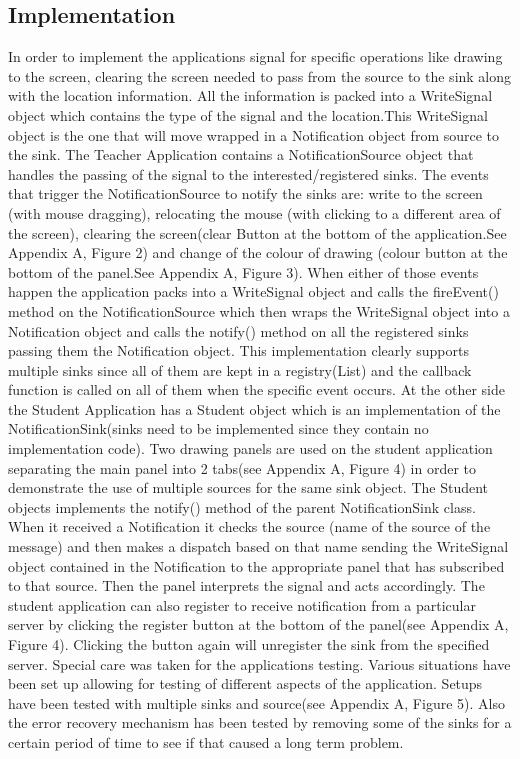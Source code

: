 \documentclass[a4paper,12pt,titlepage]{article}
\begin{document}
\subsection{Implementation}
In order to implement the applications signal for specific operations like drawing to the screen, clearing the screen needed to pass from the source to the sink along with the location information. All the information is packed into a WriteSignal object which contains the type of the signal and the location.This WriteSignal object is the one that will move wrapped in a Notification object from source to the sink. The Teacher Application contains a NotificationSource object that handles the passing of the signal to the interested/registered sinks. The events that trigger the NotificationSource to notify the sinks are: write to the screen (with mouse dragging), relocating the mouse (with clicking to a different area of the screen), clearing the screen(clear Button at the bottom of the application.See Appendix A, Figure 2) and change of the colour of drawing (colour button at the bottom of the panel.See Appendix A, Figure 3). When either of those events happen the application packs into a WriteSignal object and calls the fireEvent() method on the NotificationSource which then wraps the WriteSignal object into a Notification object and calls the notify() method on all the registered sinks passing them the Notification object. This implementation clearly supports multiple sinks since all of them are kept in a registry(List) and the callback function is called on all of them when the specific event occurs. At the other side the Student Application has a Student object which is an implementation of the NotificationSink(sinks need to be implemented since they contain no implementation code). Two drawing panels are used on the student application separating the main panel into 2 tabs(see Appendix A, Figure 4) in order to demonstrate the use of multiple sources for the same sink object. The Student objects implements the notify() method of the parent NotificationSink class. When it received a Notification it checks the source (name of the source of the message) and then makes a dispatch based on that name sending the WriteSignal object contained in the Notification to the appropriate panel that has subscribed to that source. Then the panel interprets the signal and acts accordingly. The student application can also register to receive notification from a particular server by clicking the register button at the bottom of the panel(see Appendix A, Figure 4). Clicking the button again will unregister the sink from the specified server. Special care was taken for the applications testing. Various situations have been set up allowing for testing of different aspects of the application. Setups have been tested with multiple sinks and source(see Appendix A, Figure 5). Also the error recovery mechanism has been tested by removing some of the sinks for a certain period of time to see if that caused a long term problem.
\end{document}
